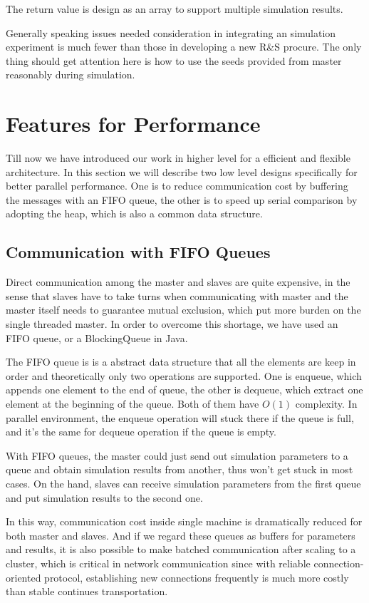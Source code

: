 \documentclass[12pt,a4paper]{report}
\begin{document}
The return value is design as an array to support multiple simulation results.

Generally speaking issues needed consideration in integrating an simulation experiment is much fewer than those in developing a new R\&S procure. The only thing should get attention here is how to use the seeds provided from master reasonably during simulation.

\section{Features for Performance}

Till now we have introduced our work in higher level for a efficient and flexible architecture. In this section we will describe two low level designs specifically for better parallel performance. One is to reduce communication cost by buffering the messages with an FIFO queue, the other is to speed up serial comparison by adopting the heap, which is also a common data structure.

\subsection{Communication with FIFO Queues}

Direct communication among the master and slaves are quite expensive, in the sense that slaves have to take turns when communicating with master and the master itself needs to guarantee mutual exclusion, which put more burden on the single threaded master. In order to overcome this shortage, we have used an FIFO queue, or a BlockingQueue in Java.

The FIFO queue is is a abstract data structure that all the elements are keep in order and theoretically only two operations are supported. One is enqueue, which appends one element to the end of queue, the other is dequeue, which extract one element at the beginning of the queue. Both of them have $O(1)$ complexity. In parallel environment, the enqueue operation will stuck there if the queue is full, and it's the same for dequeue operation if the queue is empty.

With FIFO queues, the master could just send out simulation parameters to a queue and obtain simulation results from another, thus won't get stuck in most cases. On the hand, slaves can receive simulation parameters from the first queue and put simulation results to the second one.

In this way, communication cost inside single machine is dramatically reduced for both master and slaves. And if we regard these queues as buffers for parameters and results, it is also possible to make batched communication after scaling to a cluster, which is critical in network communication since with reliable connection-oriented protocol, establishing new connections frequently is much more costly than stable continues transportation.
\end{document}
